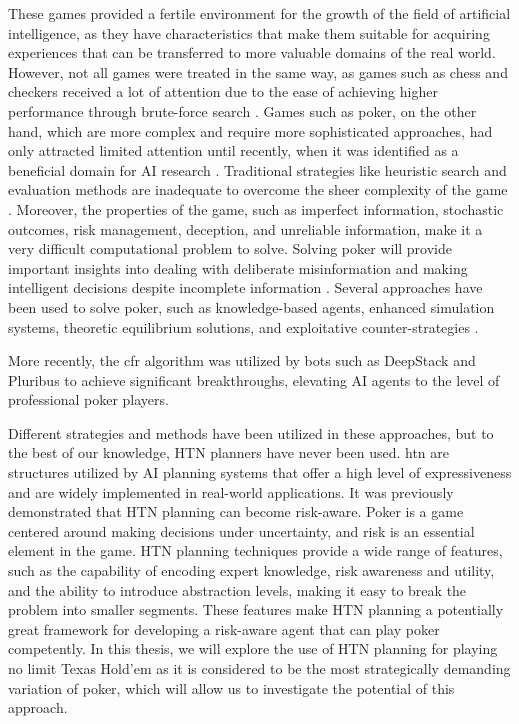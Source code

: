 These games provided a fertile environment for the growth of the field of artificial intelligence, as they have characteristics that make them suitable for acquiring experiences that can be transferred to more valuable domains of the real world. However, not all games were treated in the same way, as games such as chess and checkers received a lot of attention due to the ease of achieving higher performance through brute-force search \cite{billings1998poker}. Games such as poker, on the other hand, which are more complex and require more sophisticated approaches, had only attracted limited attention \cite{billings2006algorithms} until recently, when it was identified as a beneficial domain for AI research \cite{billings1998poker}. Traditional strategies like heuristic search and evaluation methods are inadequate to overcome the sheer complexity of the game \cite{billings_challenge_2002}. Moreover, the properties of the game, such as imperfect information, stochastic outcomes, risk management, deception, and unreliable information, make it a very difficult computational problem to solve. Solving poker will provide important insights into dealing with deliberate misinformation and making intelligent decisions despite incomplete information \cite{billings2006algorithms}. Several approaches have been used to solve poker, such as knowledge-based agents, enhanced simulation systems, theoretic equilibrium solutions, and exploitative counter-strategies \cite{rubin2011computer}.

More recently, the \gls{cfr} algorithm was utilized by bots such as DeepStack \cite{moravvcik2017deepstack} and Pluribus \cite{brown2019superhuman} to achieve significant breakthroughs, elevating AI agents to the level of professional poker players.

Different strategies and methods have been utilized in these approaches, but to the best of our knowledge, HTN planners have never been used. \gls{htn} are structures utilized by AI planning systems that offer a high level of expressiveness \cite{erol1994htn} and are widely implemented in real-world applications. It was previously \cite{alnazer2022risk} demonstrated that HTN planning can become risk-aware. Poker is a game centered around making decisions under uncertainty, and risk is an essential element in the game. HTN planning techniques provide a wide range of features, such as the capability of encoding expert knowledge, risk awareness and utility, and the ability to introduce abstraction levels, making it easy to break the problem into smaller segments. These features make HTN planning a potentially great framework for developing a risk-aware agent that can play poker competently. In this thesis, we will explore the use of HTN planning for playing no limit Texas Hold'em as it is considered to be the most strategically demanding variation of poker, which will allow us to investigate the potential of this approach.


